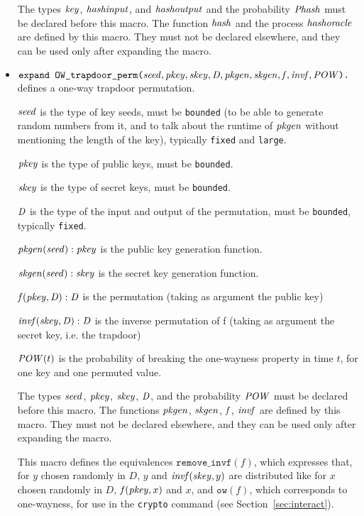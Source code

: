 \documentclass{article}
\begin{document}
\begin{itemize}
   The types $\mathit{key}$, $\mathit{hashinput}$, and $\mathit{hashoutput}$ and
   the probability $\mathit{Phash}$ must be declared before this macro.
   The function $\mathit{hash}$ and the process $\mathit{hashoracle}$ are
   defined by this macro. They must not be declared elsewhere, and
   they can be used only after expanding the macro.

\item $\texttt{expand OW\_trapdoor\_perm(}\mathit{seed}, \mathit{pkey}, \mathit{skey}, \mathit{D}, \mathit{pkgen}, \mathit{skgen}, \mathit{f}, \mathit{invf}, \mathit{POW}\texttt{).}$ defines a one-way trapdoor permutation.

   $\mathit{seed}$ is the type of key seeds, must be \texttt{bounded} (to be able to generate random numbers from it, and to talk about
  the runtime of $\mathit{pkgen}$ without mentioning the length of the key), typically \texttt{fixed} and \texttt{large}.

   $\mathit{pkey}$ is the type of public keys, must be \texttt{bounded}.

   $\mathit{skey}$ is the type of secret keys, must be \texttt{bounded}.

   $\mathit{D}$ is the type of the input and output of the permutation, must be \texttt{bounded}, typically \texttt{fixed}.

   $\mathit{pkgen}(\mathit{seed}): \mathit{pkey}$ is the public key generation function.

   $\mathit{skgen}(\mathit{seed}): \mathit{skey}$ is the secret key generation function.

   $\mathit{f}(\mathit{pkey}, \mathit{D}):\mathit{D}$ is the permutation (taking as argument the public key)

   $\mathit{invf}(\mathit{skey}, \mathit{D}):\mathit{D}$ is the inverse permutation of f (taking as argument the secret key,
         i.e. the trapdoor)

   $\mathit{POW}(t)$ is the probability of breaking the one-wayness property
   in time $t$, for one key and one permuted value.

   The types $\mathit{seed}$, $\mathit{pkey}$, $\mathit{skey}$, $\mathit{D}$, and the probability $\mathit{POW}$ must be
   declared before this macro. The functions $\mathit{pkgen}$, $\mathit{skgen}$, $\mathit{f}$, $\mathit{invf}$
   are defined by this macro. They must not be declared elsewhere, and
   they can be used only after expanding the macro. 

   This macro defines the equivalences $\texttt{remove\_invf}(f)$,
   which expresses that, for $y$ chosen randomly in $D$, $y$ and
   $\mathit{invf}(\mathit{skey}, y)$ are distributed like for $x$ chosen
   randomly in $D$, $\mathit{f}(\mathit{pkey}, x)$ and $x$, and
   $\texttt{ow}(f)$, which corresponds to one-wayness, for use in the
   \texttt{crypto} command (see Section~\ref{sec:interact}).


\end{itemize}
\end{document}
